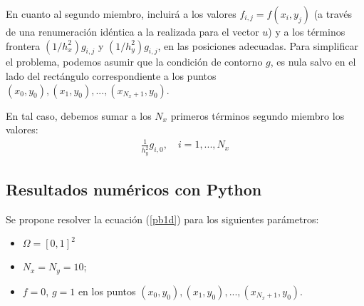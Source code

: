 \documentclass[11pt,spanish,a4wide]{article}
\begin{document}
En cuanto al segundo miembro, incluirá a los valores
$f_{i,j}=f(x_i,y_j)$ (a través de una renumeración idéntica a la
realizada para el vector $u$) y a los términos frontera
$(1/h_x^2)g_{i,j}$ y $(1/h_y^2)g_{i,j}$, en las posiciones adecuadas.
Para simplificar el problema, podemos asumir que la condición de
contorno $g$, es nula salvo en el lado del rectángulo correspondiente
a los puntos $(x_0,y_0), (x_1,y_0),...,(x_{N_x+1},y_0)$.

En tal caso, debemos sumar a los $N_x$ primeros términos segundo
miembro los valores:
\begin{align*}
  \frac{1}{h_y^2} g_{i,0}, \quad i=1,...,N_x 
\end{align*}


\subsection{Resultados numéricos con Python}
Se propone resolver la ecuación (\ref{pb1d}) para los siguientes
parámetros:
\begin{itemize}
\item $\Omega=[0,1]^2$
\item $N_x=N_y=10$;
\item $f=0$, $g=1$ en los puntos $(x_0,y_0), (x_1,y_0),...,(x_{N_x+1},y_0)$.
\end{itemize}
\end{document}
